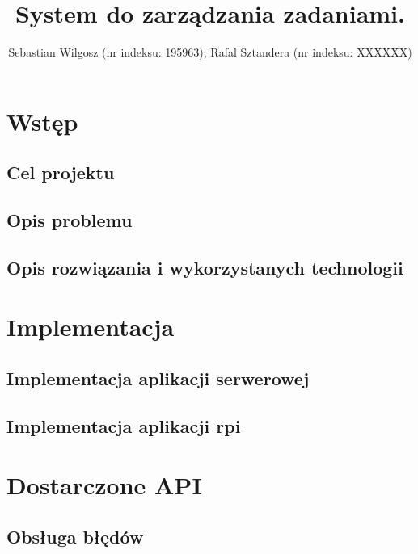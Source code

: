 \documentclass[eng,printmode]{02_class}
\title{System do zarządzania zadaniami.}
\author{Sebastian Wilgosz (nr indeksu: 195963), Rafal Sztandera (nr indeksu: XXXXXX) }
\begin{document}
  \maketitle
  \tableofcontents

  \chapter{Wstęp}
  \label{chapter:introduction}
    \section{Cel projektu}
    \label{section:target}
    

    \section{Opis problemu}
    \label{section:problem}
    

    \section{Opis rozwiązania i wykorzystanych technologii}
    \label{section:solution}
    


  \chapter{Implementacja}
  \label{chapter:implementation}
  

    \section{Implementacja aplikacji serwerowej}
    \label{section:server}
    

    \section{Implementacja aplikacji rpi}
    \label{section:rpi}
    


  \chapter{Dostarczone API}
  \label{chapter:api}
  
    \section{Obsługa błędów}
    \label{section:api-errors}
    
\end{document}
